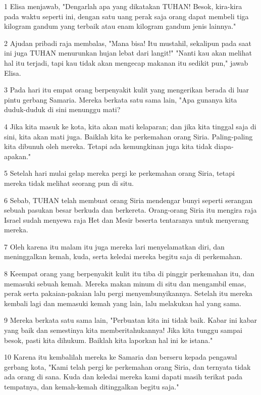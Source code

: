 \par 1 Elisa menjawab, "Dengarlah apa yang dikatakan TUHAN! Besok, kira-kira pada waktu seperti ini, dengan satu uang perak saja orang dapat membeli tiga kilogram gandum yang terbaik atau enam kilogram gandum jenis lainnya."
\par 2 Ajudan pribadi raja membalas, "Mana bisa! Itu mustahil, sekalipun pada saat ini juga TUHAN menurunkan hujan lebat dari langit!" "Nanti kau akan melihat hal itu terjadi, tapi kau tidak akan mengecap makanan itu sedikit pun," jawab Elisa.
\par 3 Pada hari itu empat orang berpenyakit kulit yang mengerikan berada di luar pintu gerbang Samaria. Mereka berkata satu sama lain, "Apa gunanya kita duduk-duduk di sini menunggu mati?
\par 4 Jika kita masuk ke kota, kita akan mati kelaparan; dan jika kita tinggal saja di sini, kita akan mati juga. Baiklah kita ke perkemahan orang Siria. Paling-paling kita dibunuh oleh mereka. Tetapi ada kemungkinan juga kita tidak diapa-apakan."
\par 5 Setelah hari mulai gelap mereka pergi ke perkemahan orang Siria, tetapi mereka tidak melihat seorang pun di situ.
\par 6 Sebab, TUHAN telah membuat orang Siria mendengar bunyi seperti serangan sebuah pasukan besar berkuda dan berkereta. Orang-orang Siria itu mengira raja Israel sudah menyewa raja Het dan Mesir beserta tentaranya untuk menyerang mereka.
\par 7 Oleh karena itu malam itu juga mereka lari menyelamatkan diri, dan meninggalkan kemah, kuda, serta keledai mereka begitu saja di perkemahan.
\par 8 Keempat orang yang berpenyakit kulit itu tiba di pinggir perkemahan itu, dan memasuki sebuah kemah. Mereka makan minum di situ dan mengambil emas, perak serta pakaian-pakaian lalu pergi menyembunyikannya. Setelah itu mereka kembali lagi dan memasuki kemah yang lain, lalu melakukan hal yang sama.
\par 9 Mereka berkata satu sama lain, "Perbuatan kita ini tidak baik. Kabar ini kabar yang baik dan semestinya kita memberitahukannya! Jika kita tunggu sampai besok, pasti kita dihukum. Baiklah kita laporkan hal ini ke istana."
\par 10 Karena itu kembalilah mereka ke Samaria dan berseru kepada pengawal gerbang kota, "Kami telah pergi ke perkemahan orang Siria, dan ternyata tidak ada orang di sana. Kuda dan keledai mereka kami dapati masih terikat pada tempatnya, dan kemah-kemah ditinggalkan begitu saja."
